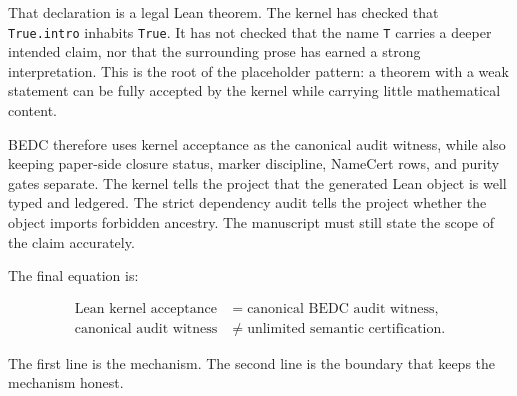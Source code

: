 That declaration is a legal Lean theorem. The kernel has checked that
\texttt{True.intro} inhabits \texttt{True}. It has not checked that the name
\texttt{T} carries a deeper intended claim, nor that the surrounding prose has
earned a strong interpretation. This is the root of the placeholder pattern:
a theorem with a weak statement can be fully accepted by the kernel while
carrying little mathematical content.

BEDC therefore uses kernel acceptance as the canonical audit witness, while also
keeping paper-side closure status, marker discipline, NameCert rows, and purity
gates separate. The kernel tells the project that the generated Lean object is
well typed and ledgered. The strict dependency audit tells the project whether
the object imports forbidden ancestry. The manuscript must still state the
scope of the claim accurately.

The final equation is:

$$
\begin{aligned}
\text{Lean kernel acceptance}
&= \text{canonical BEDC audit witness},\\
\text{canonical audit witness}
&\neq \text{unlimited semantic certification}.
\end{aligned}
$$

The first line is the mechanism. The second line is the boundary that keeps the
mechanism honest.

